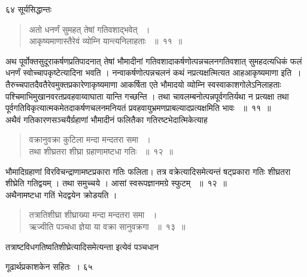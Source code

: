 \documentclass[11pt, openany]{book}
\begin{document}
\newpage
\noindent ६४ \hspace{4cm} सूर्यसिद्धान्तः
\vspace{1cm}
\begin{quote}

{\ssi अतो धनर्णं सुमहत् तेषां गतिवशाद्भवेत् ~।\\
आकृष्यमाणास्तैरेवं व्योम्नि यान्त्यनिलाहताः ~॥~११~॥}
\end{quote}
\begin{sloppypar}
अथ पूर्वोक्तसुदूराकर्षणप्रतिपादनात् तेषां भौमादीनां गतिवशादाकर्षणोत्पन्नचलनगतिवशात् सुमहदत्यधिकं फलं धनर्णं स्वोच्चापकृष्टेत्यादिना भवति । नन्वाकर्षणोत्पन्नचलनं कथं नप्रत्यक्षत्मित्यत आह\textendash आकृष्यमाणा इति~। तैरुच्चपातदैवतैरेवमुक्तप्रकारेणाकृष्यमाणा आकर्षिता एते भौमादयो व्योम्नि स्वस्वाकाशगोलेऽनिलाहताः पश्चिमाभिमुखानवरतप्रवहवाय्वाघाता यान्ति गच्छन्ति । तथा चावलम्बनोत्पन्नपूर्वगतिर्यथा न प्रत्यक्षा तथा पूर्वगतिविकृत्यात्मकमेतदाकर्षणचलनमनियतं प्रवहवायुभ्रमणप्राबल्यादप्रत्यक्षमिति भावः ~॥~११~॥\\
\noindent अथैवं गतिकारणसञ्चयैर्ग्रहाणां भौमादीनं फलितैका गतिरष्टभेदात्मिकेत्याह\textendash
\end{sloppypar}
\begin{quote}

{\ssi वक्रानुवक्रा कुटिला मन्दा मन्दतरा समा ~।\\
तथा शीघ्रतरा शीघ्रा ग्रहाणामष्टधा गतिः ~॥~१२~॥}
\end{quote}
\begin{sloppypar}
भौमादिग्रहाणां विरविचन्द्राणामष्टप्रकारा गतिः फलिता। तत्र वक्रेत्यादिसमेत्यन्तं षट्प्रकारा गतिः शीघ्रतरा शीघ्रेति गतिद्वयम् । तथा समुच्चये । आसां स्वरूपज्ञानमग्रे स्फुटम् ~॥~१२~॥\\
\noindent अथैनामष्टधा गतिं भेदद्वयेन क्रोडयति ।
\end{sloppypar}
\begin{quote}

{\ssi तत्रातिशीघ्रा शीघ्राख्या मन्दा मन्दतरा समा ~।\\
ऋज्वीति पञ्चधा ज्ञेया या वक्रा सानुवक्रगा ~॥~१३~॥}
\end{quote}
तत्राष्टविधगतिष्वतिशीघ्रेत्यादिसमेत्यन्ता इत्येवं पञ्चधान

\newpage

\hspace{3cm} गूढार्थप्रकाशकेन सहितः~। \hfill ६५
\vspace{1cm}
\end{document}
